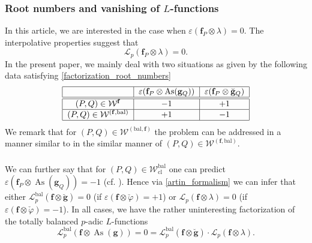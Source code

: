 \documentclass[10pt]{amsart}
\numberwithin{equation}{section}
\theoremstyle{definition}
\theoremstyle{remark} %
\newcommand{\mrm}{\mathrm}
\newcommand{\As}{\operatorname{As}}
\renewcommand{\b}{\mathrm{bal}}
\newcommand{\f}{\mathbf{f}}
\newcommand{\g}{\mathbf{g}}
\newcommand{\W}{\mathcal{W}}
\begin{document}
	\subsubsection{Root numbers and vanishing of $ L $-functions} In this article, we are interested in the case when $ \varepsilon(\f_P \otimes  \lambda) = 0 $. The interpolative properties suggest that 
	$$ \mathscr{L}_p(\f_P \otimes \lambda) = 0 .$$
	In the present paper, we mainly deal with two situations as given by the following data satisfying \eqref{factorization_root_numbers} 
	\begin{align}
		\label{table_rootnumber}
		\begin{tabular}{|c|c|c|}
			\hline
			& $\varepsilon(\f_P \otimes \As(\g_Q))$    & {$\varepsilon(\f_P\otimes \breve{\g}_Q)$}   \\
			\hline\hline
			$(P,Q)\in \W^{\f}$ & $-1$    & \multicolumn{1}{c|}{+1} \\ \hline
			$(P,Q)\in \W^{(\f,\b)}$  & $+1$   & \multicolumn{1}{c|}{$-1$} \\ \hline
		\end{tabular}
	\end{align}
	We remark that for $ (P,Q)\in \W^{(\b,\f)} $ the problem can be addressed in a manner similar to in the similar manner of $ (P,Q)\in \W^{(\f,\b)} $. 
	\subsubsection{}
	We can further say that for $ (P,Q) \in \W_{\mrm{cl}}^{\b} $ one can predict $ \varepsilon(\f_P \otimes \As(\g_Q) ) =- 1 $ (cf. \cite{DR22,BSV22b}). Hence via \eqref{artin_formalism} we can infer that either $ \mathscr{L}_p^\b(\f \otimes \breve{\g} ) =0 $ (if $\varepsilon(\f\otimes \check{\varphi})=+1$)
	or $ \mathscr{L}_p(\f \otimes \lambda) = 0 $ (if $\varepsilon(\f\otimes \check{\varphi})=-1$). 
	In all cases, we have the rather uninteresting factorization of the totally balanced $ p $-adic $ L $-functions
	$$ \mathscr{L}_p^{\b}(\f \otimes \As(\g) ) = 0 = \mathscr{L}_p^{\b}(\f \otimes \breve{\g} )\cdot \mathscr{L}_p(\f \otimes \lambda) .$$
\end{document}
